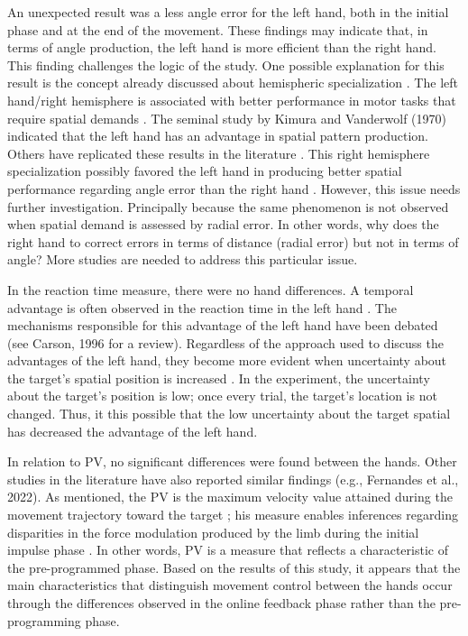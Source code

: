 \documentclass[man,a4paper,12pt,floatsintext]{apa6}
\begin{document}
An unexpected result was a less angle error for the left hand, both in the initial phase and at the end of the movement. These findings may indicate that, in terms of angle production, the left hand is more efficient than the right hand. This finding challenges the logic of the study. One possible explanation for this result is the concept already discussed about hemispheric specialization \citep{Fernandes2022a,Taylor1980}. The left hand/right hemisphere is associated with better performance in motor tasks that require spatial demands \citep{Floegel2017}. The seminal study by Kimura and Vanderwolf (1970) indicated that the left hand has an advantage in spatial pattern production. Others have replicated these results in the literature \citep{Nachshon1975,Gur2000}. This right hemisphere specialization possibly favored the left hand in producing better spatial performance regarding angle error than the right hand \citep{Kimura1970}. However, this issue needs further investigation. Principally because the same phenomenon is not observed when spatial demand is assessed by radial error. In other words, why does the right hand to correct errors in terms of distance (radial error) but not in terms of angle? More studies are needed to address this particular issue. 

In the reaction time measure, there were no hand differences. A temporal advantage is often observed in the reaction time in the left hand \citep{Carson1995b,Helsen1998,Elliott1995}. The mechanisms responsible for this advantage of the left hand have been debated (see Carson, 1996 for a review). Regardless of the approach used to discuss the advantages of the left hand, they become more evident when uncertainty about the target's spatial position is increased \citep{Elliott1993}. In the experiment, the uncertainty about the target's position is low; once every trial, the target's location is not changed. Thus, it this possible that the low uncertainty about the target spatial has decreased the advantage of the left hand.

In relation to PV, no significant differences were found between the hands. Other studies in the literature have also reported similar findings (e.g., Fernandes et al., 2022). As mentioned,  the PV is the maximum velocity value attained during the movement trajectory toward the target \citep{Lage2013b}; his measure enables inferences regarding disparities in the force modulation produced by the limb during the initial impulse phase \citep{Elliott2010d}. In other words, PV is a measure that reflects a characteristic of the pre-programmed phase. Based on the results of this study, it appears that the main characteristics that distinguish movement control between the hands occur through the differences observed in the online feedback phase rather than the pre-programming phase.
\end{document}
